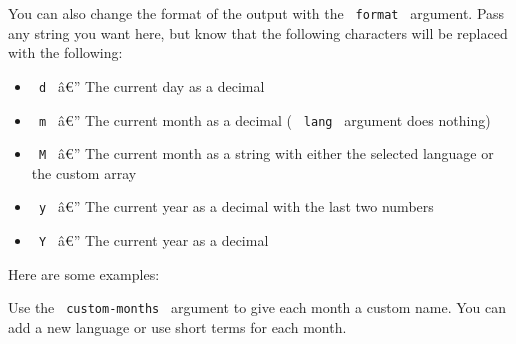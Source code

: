 \begin{Shaded}
\begin{Highlighting}[]
\end{Highlighting}
\end{Shaded}

You can also change the format of the output with the
\texttt{\ format\ } argument. Pass any string you want here, but know
that the following characters will be replaced with the following:

\begin{itemize}
\tightlist
\item
  \texttt{\ d\ } â€'' The current day as a decimal
\item
  \texttt{\ m\ } â€'' The current month as a decimal ( \texttt{\ lang\ }
  argument does nothing)
\item
  \texttt{\ M\ } â€'' The current month as a string with either the
  selected language or the custom array
\item
  \texttt{\ y\ } â€'' The current year as a decimal with the last two
  numbers
\item
  \texttt{\ Y\ } â€'' The current year as a decimal
\end{itemize}

Here are some examples:

\begin{Shaded}
\begin{Highlighting}[]
\end{Highlighting}
\end{Shaded}

Use the \texttt{\ custom-months\ } argument to give each month a custom
name. You can add a new language or use short terms for each month.

\begin{Shaded}
\begin{Highlighting}[]
\end{Highlighting}
\end{Shaded}

